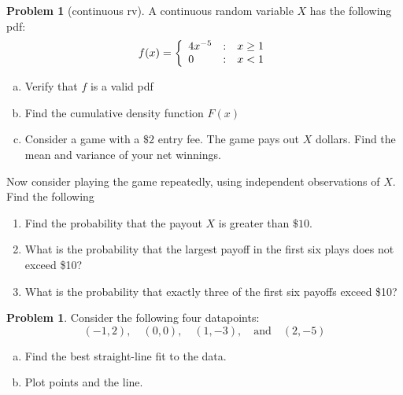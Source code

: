 \documentclass[10pt]{article}
\theoremstyle{definition}
\newtheorem{problem}[theorem]{Problem}
\newcommand{\1}[1]{\textbf{1}_{\left[#1\right]}} %
\begin{document}
\newpage
\begin{problem}[continuous rv]
  A continuous random variable $X$ has the following pdf:
  \begin{equation*}
    f(x) = \left\{ \begin{array}{l@{\quad:\quad}l} 4x^{-5} & x \geq 1\\ 0& x<1\end{array}\right.
  \end{equation*}
  \begin{enumerate}[(a)]
    \item Verify that $f$ is a valid pdf
    \item Find the cumulative density function $F(x)$
    \item Consider a game with a $\$2$ entry fee. The game pays out $X$
    dollars. Find the mean and variance of your net winnings.
  \end{enumerate}
  Now consider playing the game repeatedly, using independent
  observations of $X$. Find the following
  \begin{enumerate}
    \item[(d)] Find the probability that the payout $X$ is greater than $\$10$.
    \item[(e)] What is the probability that the largest payoff in the first six
    plays does not exceed \$10?
    \item[(f)] What is the probability that exactly three of the first six payoffs exceed \$10?
  \end{enumerate}
\end{problem}



\begin{problem}%
  Consider the following four datapoints:
  \begin{equation*}
    (-1,2), \quad (0,0), \quad (1,-3), \quad\text{and} \quad (2,-5)
  \end{equation*}
  \begin{enumerate}[(a)]
    \item Find the best straight-line fit to the data. 
    \item Plot points and the line.
  \end{enumerate}
\end{problem}
\end{document}
